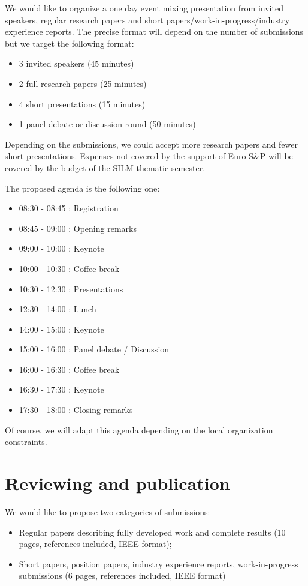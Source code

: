 \documentclass[a4paper,11pt]{article} %
\numberwithin{equation}{section} %
\numberwithin{figure}{section} %
\numberwithin{table}{section} %
\begin{document}
We would like to organize a one day event mixing presentation from invited
speakers, regular research papers and short
papers/work-in-progress/industry experience reports. The precise format
will depend on the number of submissions but we target the following
format:
%
\begin{itemize}
    \item 3 invited speakers (45 minutes)
    \item 2 full research papers (25 minutes)
    \item 4 short presentations (15 minutes)
    \item 1 panel debate or discussion round (50 minutes)
\end{itemize}

Depending on the submissions, we could accept more research papers and
fewer short presentations. Expenses not covered by the support of Euro S\&P
will be covered by the budget of the SILM thematic semester.

The proposed agenda is the following one:
%
\begin{itemize}
    \item 08:30 - 08:45 : Registration
    \item 08:45 - 09:00 : Opening remarks
    \item 09:00 - 10:00 : Keynote
    \item 10:00 - 10:30 : Coffee break
    \item 10:30 - 12:30 : Presentations
    \item 12:30 - 14:00 : Lunch
    \item 14:00 - 15:00 : Keynote
    \item 15:00 - 16:00 : Panel debate / Discussion
    \item 16:00 - 16:30 : Coffee break
    \item 16:30 - 17:30 : Keynote
    \item 17:30 - 18:00 : Closing remarks
\end{itemize}
%
Of course, we will adapt this agenda depending on the local organization constraints.

\section{Reviewing and publication}

We would like to propose two categories of submissions:
%
\begin{itemize}
%
    \item Regular papers describing fully developed work and complete
results (10 pages, references included, IEEE format);
%
    \item Short papers, position papers, industry experience reports,
work-in-progress submissions (6 pages, references included, IEEE format)
%
\end{itemize}
\end{document}
